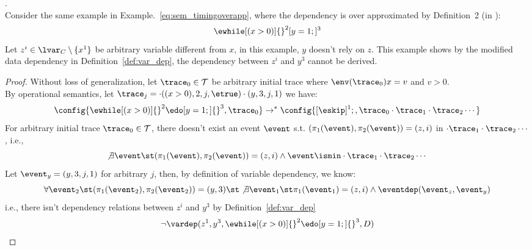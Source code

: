 \begin{example}.
\\
Consider the same example in Example.~\ref{eq:sem_timingoverapp}, where the dependency is over approximated by Definition~2 (in \cite{cousot2019abstract}):
\[
	\ewhile [(x > 0)] {}^2 [ y = 1;]{}^3 
\]
Let $z^i \in \lvar_{C} \setminus \{x^1\}$ be arbitrary variable different from $x$,
in this example, $y$ doesn't rely on $z$. 
This example shows by the modified data dependency in Definition~\ref{def:var_dep}, the dependency between $z^i$ and $y^3$ cannot be derived.
%
\begin{proof}
%
Without loss of generalization, 
let $\trace_0 \in \mathcal{T}$ be arbitrary initial trace where $\env(\trace_0) x = v$ and $v > 0$.
\\
By operational semantics, let $\trace_j = \cdot ((x > 0), 2, j, \etrue) \cdot(y, 3, j, 1)$ we have:
\[
\label{eq:os_timingdep}
\config{\ewhile  [(x > 0)]{}^2 \edo [y = 1;]{}^3 , \trace_0} \rightarrow^*
\config{[\eskip]{}^1;, \trace_0 \cdot \trace_1 \cdot \trace_2 \cdots}
\]
%
For arbitrary initial trace $\trace_0 \in \mathcal{T}$, there doesn't exist an event $\event$ s.t. 
$(\pi_1(\event), \pi_2(\event)) = (z, i)$ in $\cdot \trace_1 \cdot \trace_2 \cdots$, i.e.,
\[
  \not\exists \event \st (\pi_1(\event), \pi_2(\event)) = (z, i) \land
 \event \ismin \cdot \trace_1 \cdot \trace_2 \cdots
\]
%
Let $\event_y = (y, 3, j, 1)$ for arbitrary $j$, then, by definition of variable dependency, we know:
\[ 
\forall  \event_2 \st (\pi_1(\event_2), \pi_2(\event_2)) = (y, 3) 
\st \not\exists \event_1 \st \pi_1(\event_1) = (z, i) \land \eventdep(\event_z, \event_y)
\]
%
i.e., there isn't dependency relations between $z^i$ and $y^3$ by Definition~\ref{def:var_dep}
\[
  \neg \vardep(z^1, y^3, \ewhile  [(x > 0)]{}^2 \edo [y = 1;]{}^3, D)
\]
\end{proof}
\end{example}
%
